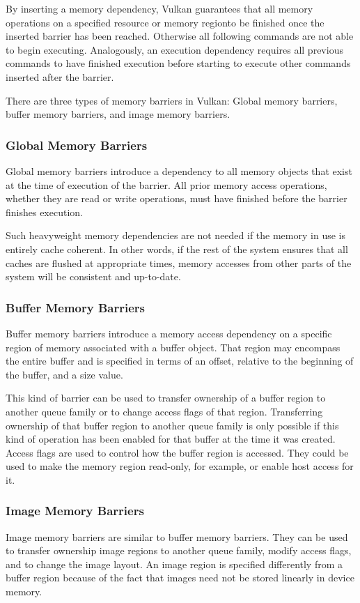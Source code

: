       By inserting a memory dependency, Vulkan guarantees that all memory operations on a specified resource or memory regionto be finished once the inserted barrier has been reached. Otherwise all following commands are not able to begin executing. Analogously, an execution dependency requires all previous commands to have finished execution before starting to execute other commands inserted after the barrier.

      There are three types of memory barriers in Vulkan: Global memory barriers, buffer memory barriers, and image memory barriers.

      \subsubsection{Global Memory Barriers}
        Global memory barriers introduce a dependency to all memory objects that exist at the time of execution of the barrier. All prior memory access operations, whether they are read or write operations, must have finished before the barrier finishes execution.

        Such heavyweight memory dependencies are not needed if the memory in use is entirely cache coherent. In other words, if the rest of the system ensures that all caches are flushed at appropriate times, memory accesses from other parts of the system will be consistent and up-to-date.

      \subsubsection{Buffer Memory Barriers}
        Buffer memory barriers introduce a memory access dependency on a specific region of memory associated with a buffer object. That region may encompass the entire buffer and is specified in terms of an offset, relative to the beginning of the buffer, and a size value.

        This kind of barrier can be used to transfer ownership of a buffer region to another queue family or to change access flags of that region. Transferring ownership of that buffer region to another queue family is only possible if this kind of operation has been enabled for that buffer at the time it was created. Access flags are used to control how the buffer region is accessed. They could be used to make the memory region read-only, for example, or enable \gls{host} access for it.

      \subsubsection{Image Memory Barriers}
        Image memory barriers are similar to buffer memory barriers. They can be used to transfer ownership image regions to another queue family, modify access flags, and to change the image layout. An image region is specified differently from a buffer region because of the fact that images need not be stored linearly in \gls{device} memory.

